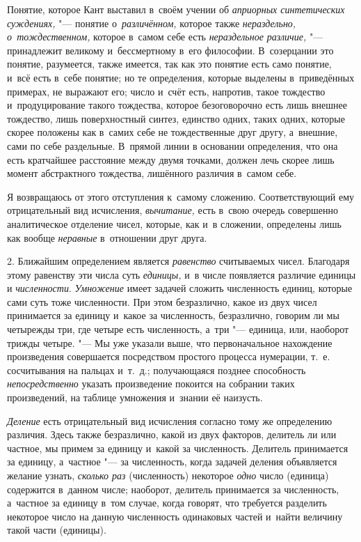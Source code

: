Понятие, которое Кант выставил в~своём учении об
{\em априорных синтетических суждениях,} "--- понятие о~{\em различённом,}
которое также {\em нераздельно, о~тождественном,} которое в~самом себе есть
{\em нераздельное различие,} "--- принадлежит великому и~бессмертному в~его
философии. В~созерцании это понятие, разумеется, также имеется, так как это
понятие есть само понятие, и~всё есть в~себе понятие; но те определения,
которые выделены в~приведённых примерах, не выражают его; число и~счёт
есть, напротив, такое тождество и~продуцирование такого тождества, которое
безоговорочно есть лишь внешнее тождество, лишь поверхностный синтез, единство
одних, таких одних, которые скорее положены как в~самих себе не
тождественные друг другу, а~внешние, сами по себе раздельные. В~прямой линии
в основании определения, что она есть кратчайшее расстояние между двумя
точками, должен лечь скорее лишь момент абстрактного тождества, лишённого
различия в~самом себе.

Я возвращаюсь от этого отступления к~самому сложению. Соответствующий ему
отрицательный вид исчисления, {\em вычитание,} есть в~свою очередь совершенно
аналитическое отделение чисел, которые, как и~в сложении, определены лишь как
вообще {\em неравные} в~отношении друг друга.

2. Ближайшим определением является {\em равенство} считываемых
чисел. Благодаря этому равенству эти числа
суть {\em единицы,} и~в числе появляется различие единицы и {\em численности}.
{\em Умножение} имеет задачей сложить численность единиц,
которые сами суть тоже численности. При этом безразлично, какое из двух чисел
принимается за единицу и~какое за численность, безразлично, говорим ли мы
четырежды три, где четыре есть численность, а~три "--- единица, или, наоборот
трижды четыре. "--- Мы уже указали выше, что первоначальное нахождение
произведения совершается посредством простого процесса нумерации, т.~е.
сосчитывания на пальцах и~т.~д.; получающаяся позднее способность
{\em непосредственно} указать произведение покоится на собрании таких
произведений, на таблице умножения и~знании её наизусть.

{\em Деление} есть отрицательный вид исчисления согласно тому же определению
различия. Здесь также безразлично, какой из двух факторов, делитель ли или
частное, мы примем за единицу и~какой за численность. Делитель принимается за
единицу, а~частное "--- за численность, когда задачей деления объявляется
желание узнать, {\em сколько раз} (численность) некоторое {\em одно} число
(единица) содержится в~данном числе; наоборот, делитель принимается за
численность, а~частное за единицу в~том случае, когда говорят, что требуется
разделить некоторое число на данную численность одинаковых частей и~найти
величину такой части (единицы).

